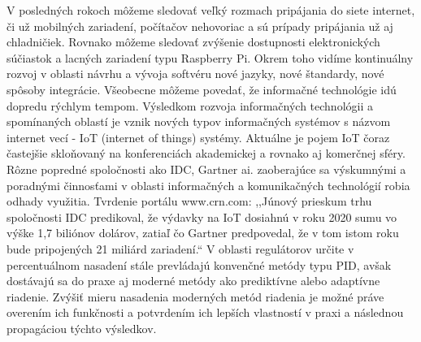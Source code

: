 \indent V posledných rokoch môžeme sledovať veľký rozmach pripájania do siete internet, či už mobilných zariadení, počítačov nehovoriac a sú prípady pripájania už aj chladničiek. Rovnako môžeme sledovať zvýšenie dostupnosti elektronických súčiastok a lacných zariadení typu Raspberry Pi. Okrem toho vidíme kontinuálny rozvoj v oblasti návrhu a vývoja softvéru nové jazyky, nové štandardy, nové spôsoby integrácie. Všeobecne môžeme povedať, že informačné technológie idú dopredu rýchlym tempom. Výsledkom rozvoja informačných technológii a spomínaných oblastí je vznik nových typov informačných systémov s názvom internet vecí - IoT (internet of things) systémy. Aktuálne je pojem IoT čoraz častejšie skloňovaný na konferenciách akademickej a rovnako aj komerčnej sféry. Rôzne popredné spoločnosti ako IDC, Gartner ai. zaoberajúce sa výskumnými a poradnými činnosťami v oblasti informačných a komunikačných technológií robia odhady využitia. Tvrdenie portálu www.crn.com:
,,Júnový prieskum trhu spoločnosti IDC predikoval, že výdavky na IoT dosiahnú v roku 2020 sumu vo výške 1,7 biliónov dolárov, zatiaľ čo Gartner predpovedal, že v tom istom roku bude pripojených 21 miliárd zariadení.``\cite{IOT01} V oblasti regulátorov určite v percentuálnom nasadení stále prevládajú konvenčné metódy typu PID, avšak dostávajú sa do praxe aj moderné metódy ako prediktívne alebo adaptívne riadenie. Zvýšiť mieru nasadenia moderných metód riadenia je možné práve overením ich funkčnosti a potvrdením ich lepších vlastností v praxi a následnou propagáciou týchto výsledkov.\\
